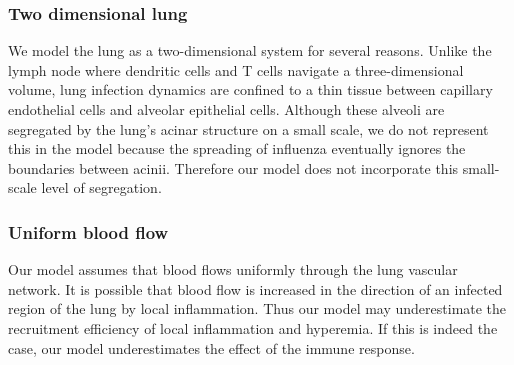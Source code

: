 \documentclass[10pt]{article}
\newcommand{\removed}[1]{{\color{dkred}\sout{#1}}}
\newcommand{\fred}[1]{{\color{dkblue}#1}}
\begin{document}
\subsubsection{Two dimensional lung}

We model the lung as a two-dimensional system for several reasons.  Unlike the lymph node where dendritic cells and T cells navigate a three-dimensional volume, lung infection dynamics are confined to a thin tissue between capillary endothelial cells and alveolar epithelial cells.  Although these alveoli are segregated by the lung's acinar structure on a small scale, we do not represent this in the model because the spreading of influenza eventually ignores the boundaries between acinii.  Therefore our model does not incorporate this small-scale level of segregation.

\subsubsection{Uniform blood flow}

Our model assumes that blood flows uniformly through the lung vascular network.  It is possible that blood flow is increased in the direction of an infected region of the lung by local inflammation.  Thus our model may underestimate the recruitment efficiency of local inflammation and hyperemia.  If this is indeed the case, our model underestimates the effect of the immune response.

%
\end{document}
